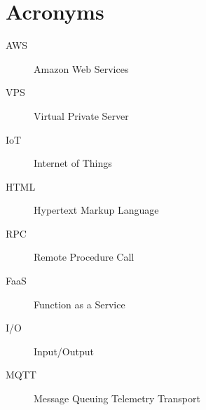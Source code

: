 \documentclass[../main.tex]{subfiles}
\begin{document}
\chapter{Acronyms}

\begin{description}
  \item[AWS] Amazon Web Services
  \item[VPS] Virtual Private Server
  \item[IoT] Internet of Things
  \item[HTML] Hypertext Markup Language
  \item[RPC] Remote Procedure Call
  \item[FaaS] Function as a Service
  \item[I/O] Input/Output
  \item[MQTT] Message Queuing Telemetry Transport
\end{description}

\end{document}
